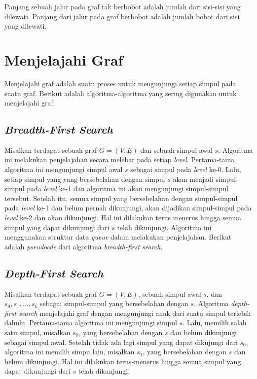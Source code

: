 Panjang sebuah jalur pada graf tak berbobot adalah jumlah dari sisi-sisi yang dilewati. Panjang dari jalur pada graf berbobot adalah jumlah bobot dari sisi yang dilewati.

\section{Menjelajahi Graf}

Menjelajahi graf adalah suatu proses untuk mengunjungi setiap simpul pada suatu graf. Berikut adalah 
algoritma-algoritma yang sering digunakan untuk menjelajahi graf.

    \subsection{\textit{Breadth-First Search}}
    Misalkan terdapat sebuah graf $G = (V, E)$ dan sebuah simpul awal $s$. Algoritma ini melakukan penjelajahan secara melebar pada setiap \textit{level}. 
    Pertama-tama algoritma ini mengunjungi simpul awal $s$ sebagai simpul pada \textit{level} ke-0. Lalu, setiap simpul yang 
    yang bersebelahan dengan simpul $s$ akan menjadi simpul-simpul pada \textit{level} ke-1 dan algoritma ini akan mengunjungi 
    simpul-simpul tersebut. Setelah itu, semua simpul yang bersebelahan 
    dengan simpul-simpul pada \textit{level} ke-1 dan belum pernah dikunjungi, akan dijadikan simpul-simpul pada \textit{level} ke-2 dan 
    akan dikunjungi. Hal ini dilakukan terus menerus hingga semua simpul yang dapat dikunjungi dari $s$  telah dikunjungi.
    Algoritma ini menggunakan struktur data \textit{queue} dalam melakukan penjelajahan.
    Berikut adalah \textit{pseudocde} dari algoritma \textit{breadth-first search}.

    \medskip
    

    \subsection{\textit{Depth-First Search}}
    Misalkan terdapat sebuah graf $G = (V, E)$, sebuah simpul awal $s$, dan $s_{0}, s_{1}, ..., s_{k}$ sebagai simpul-simpul 
    yang bersebelahan dengan $s$. Algoritma \textit{depth-first search} menjelajahi 
    graf dengan mengunjungi anak dari suatu simpul terlebih dahulu. Pertama-tama algoritma ini mengunjungi simpul $s$. Lalu, 
    memilih salah satu simpul, misalkan $s_{0}$, yang bersebelahan dengan $s$ dan belum dikunjungi sebagai simpul awal.
    Setelah tidak ada lagi simpul yang dapat dikujungi dari $s_{0}$, algoritma ini memilih simpu lain, misalkan $s_{1}$, yang bersebelahan dengan $s$ dan belum dikunjungi.
    Hal ini dilakukan terus-menerus hingga semua simpul yang dapat dikunjungi dari $s$ telah dikunjungi.

